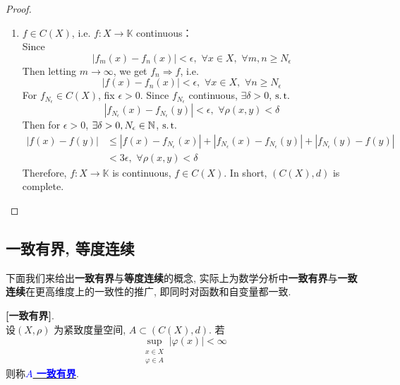 \begin{proposition}
\begin{proof}
\begin{enumerate}
				\item $f \in C(X)$, i.e. $f : X \longrightarrow \mathbb{K}$ continuous：\\
				Since 
				\[ \left| f_{m}(x) - f_{n}(x) \right| < \epsilon , \,\, \forall x \in X , \,\, \forall m , n \geq N_\epsilon \]
				Then letting $m \to \infty$, we get $f_n \Rightarrow f$, i.e.
				\[ \left| f(x) - f_{n}(x) \right| < \epsilon , \,\, \forall x \in X , \,\, \forall n \geq N_\epsilon \]
				For $f_{N_\epsilon} \in C(X)$, fix $\epsilon > 0$. Since $f_{N_\epsilon}$ continuous, $\exists \delta > 0$, $\operatorname{s.t.}$
				\[ \left| f_{N_\epsilon}(x) - f_{N_\epsilon}(y) \right| < \epsilon , \,\, \forall \rho(x , y) < \delta \]
				Then for $\epsilon > 0$, $\exists \delta > 0 , N_\epsilon \in \mathbb{N}$, $\operatorname{s.t.}$
				\begin{align}
					\left| f(x) - f(y) \right| 
					&\leq \left| f(x) - f_{N_{\epsilon}}(x) \right| + \left| f_{N_\epsilon}(x) - f_{N_\epsilon}(y) \right| + \left| f_{N_\epsilon}(y) - f(y) \right| \\
					&< 3\epsilon , \,\, \forall \rho(x , y) < \delta
				\end{align}
				Therefore, $f : X \longrightarrow \mathbb{K}$ is continuous, $f \in C(X)$. In short, $(C(X) , d)$ is complete.
			\end{enumerate}
		\end{proof}
	\end{proposition}

\newpage

\subsection{一致有界, 等度连续}
	下面我们来给出\textbf{一致有界}与\textbf{等度连续}的概念, 实际上为数学分析中\textbf{一致有界}与\textbf{一致连续}在更高维度上的一致性的推广, 即同时对函数和自变量都一致.
	
	\vspace{2em}
	
	\begin{defn}\label{def 1.7.2}
		\textbf{[一致有界]}. \\
		设$(X , \rho)$ 为紧致度量空间, $A \subset (C(X) , d)$. 若
		\[ \sup_{\substack{x \in X \\ \varphi \in A}} \left| \varphi(x) \right| < \infty \]
		则称\underline{\textcolor{blue}{\textbf{$A$ 一致有界}}}.
	\end{defn}

	\vspace{10em}
	
